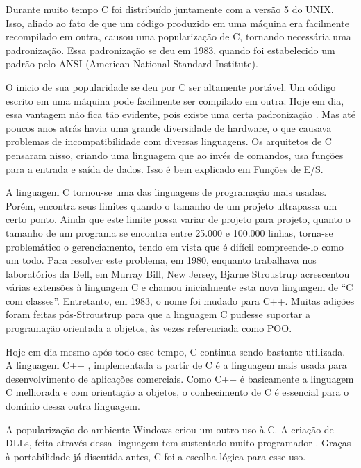 \documentclass[
    12pt,               %
    openright,          %
    twoside,            %
    a4paper,            %
    brazil              %
    ]{abntex2}
\begin{document}
Durante muito tempo C foi distribuído juntamente com a versão 5 do UNIX. Isso, aliado ao 
fato de que um código produzido em uma máquina era facilmente recompilado em outra, causou 
uma popularização de C, tornando necessária uma padronização. Essa padronização se deu em 
1983, quando foi estabelecido um padrão pelo ANSI (American National Standard Institute).

O inicio de sua popularidade se deu por C ser altamente portável. Um código escrito em uma 
máquina pode facilmente ser compilado em outra. Hoje em dia, essa vantagem não fica tão 
evidente, pois existe uma certa padronização . Mas até poucos anos atrás havia uma grande 
diversidade de hardware, o que causava problemas de incompatibilidade com diversas linguagens. 
Os arquitetos de C pensaram nisso, criando uma linguagem que ao invés de comandos, usa funções 
para a entrada e saída de dados. Isso é bem explicado em Funções de E/S.

A linguagem C tornou-se uma das linguagens de programação mais usadas. Porém, encontra seus 
limites quando o tamanho de um projeto ultrapassa um certo ponto. Ainda que este limite possa 
variar de projeto para projeto, quanto o tamanho de um programa se encontra entre 25.000 e 100.000 
linhas, torna-se problemático o gerenciamento, tendo em vista que é difícil compreende-lo como 
um todo. Para resolver este problema, em 1980, enquanto trabalhava nos laboratórios da Bell, 
em Murray Bill, New Jersey, Bjarne Stroustrup acrescentou várias extensões à linguagem C e chamou 
inicialmente esta nova linguagem de “C com classes”. Entretanto, em 1983, o nome foi mudado para C++. 
Muitas adições foram feitas pós-Stroustrup para que a linguagem C pudesse suportar a programação 
orientada a objetos, às vezes referenciada como POO.

Hoje em dia mesmo após todo esse tempo, C continua sendo bastante utilizada. A linguagem C++ , 
implementada a partir de C é a linguagem mais usada para desenvolvimento de aplicações comerciais. 
Como C++ é basicamente a linguagem C melhorada e com orientação a objetos, o conhecimento de C é 
essencial para o domínio dessa outra linguagem.

A popularização do ambiente Windows criou um outro uso à C. A criação de DLLs, feita através dessa 
linguagem tem sustentado muito programador . Graças à portabilidade já discutida antes, C foi a 
escolha lógica para esse uso.
\end{document}
